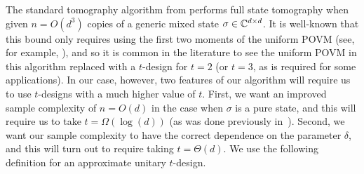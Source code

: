 \documentclass{article}
\begin{document}

The standard tomography algorithm from  performs full state tomography when given $n = O(d^3)$ copies of a generic mixed state $\sigma \in \mathbb C^{d \times d}$.
It is well-known that this bound only requires using the first two moments of the uniform POVM (see, for example, \cite[Section 5.1]{Wri16}), and so it is common in the literature to see the uniform POVM in this algorithm replaced with a $t$-design for $t = 2$ (or $t = 3$, as is required for some applications).
In our case, however, two features of our algorithm will require us to use $t$-designs with a much higher value of $t$.
First, we want an improved sample complexity of $n = O(d)$ in the case when $\sigma$ is a pure state, and this will require us to take $t = \Omega(\log(d))$ (as was done previously in~\cite{HKOT23}).
Second, we want our sample complexity to have the correct dependence on the parameter $\delta$,
and this will turn out to require taking $t = \Theta(d)$.
We use the following definition for an approximate unitary $t$-design.
\end{document}
